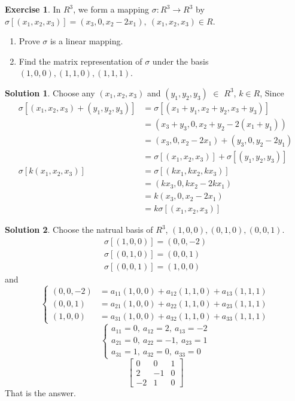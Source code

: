 \documentclass{article}
\theoremstyle{definition}
\newtheorem{exe}{Exercise}[section]
\newtheorem{sol}{Solution}[exe]
\begin{document}
\begin{exe}
    In $R^{3}$, we form a mapping $\sigma:R^{3}\rightarrow R^{3}$ 
    by $\sigma[(x_{1},x_{2},x_{3})]=(x_3,0,x_{2}-2x_{1}),\ (x_{1},x_{2},x_{3})\in R$.
    \begin{enumerate}
        \item Prove $\sigma$ is a linear mapping.
        \item Find the matrix representation of $\sigma$ under the basis
        $(1,0,0),(1,1,0),(1,1,1)$.
    \end{enumerate}
\end{exe}
\begin{sol}
    Choose any $(x_{1},x_{2},x_{3})$ and $(y_{1},y_{2},y_{3})$ $\in$ $R^{3}$, $k\in R$,
Since 
\begin{align*}
    \sigma[(x_{1},x_{2},x_{3})+(y_{1},y_{2},y_{3})]
    & = \sigma[(x_{1}+y_{1},x_{2}+y_{2},x_{3}+y_{3})]\\ 
    & = (x_{3}+y_{3},0,x_{2}+y_{2}-2(x_{1}+y_{1}))\\
    & =(x_{3},0,x_{2}-2x_{1})+(y_{3},0,y_{2}-2y_{1})\\
    & =\sigma[(x_{1},x_{2},x_{3})]+ \sigma[(y_{1},y_{2},y_{3})]\\
    \sigma[k(x_{1},x_{2},x_{3})]
    & =\sigma[(kx_{1},kx_{2},kx_{3})]\\
    & =(kx_{3},0,kx_{2}-2kx_{1})\\
    & =k(x_{3},0,x_{2}-2x_{1})\\
    & =k\sigma[(x_{1},x_{2},x_{3})]
\end{align*}
\end{sol}
\begin{sol}
Choose the natrual basis of $R^{3}$, $(1,0,0),(0,1,0),(0,0,1)$.
\begin{align*}
    \sigma[(1,0,0)]=(0,0,-2)\\
    \sigma[(0,1,0)]=(0,0,1)\\
    \sigma[(0,0,1)]=(1,0,0)
\end{align*}
and 
$$
\begin{cases}
    (0,0,-2)& =a_{11}(1,0,0)+a_{12}(1,1,0)+a_{13}(1,1,1)\\
    (0,0,1) & =a_{21}(1,0,0)+a_{22}(1,1,0)+a_{23}(1,1,1)\\
    (1,0,0) & =a_{31}(1,0,0)+a_{32}(1,1,0)+a_{33}(1,1,1)
\end{cases}
$$
$$
\begin{cases}
    a_{11}=0 ,\ a_{12}=2 ,\ a_{13}=-2\\
    a_{21}=0,\ a_{22}=-1,\ a_{23}= 1\\
    a_{31}=1,\ a_{32}=0,\ a_{33}=0
\end{cases}
$$
$$
\begin{bmatrix}
    0 & 0 & 1\\
    2 & -1 & 0\\
    -2 & 1 & 0
\end{bmatrix}
$$
That is the answer.
\end{sol}
\end{document}
